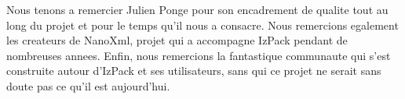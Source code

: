 Nous tenons a remercier Julien Ponge pour son encadrement de qualite tout au long du projet et pour le temps qu'il nous a consacre. Nous remercions egalement les createurs de NanoXml, projet qui a accompagne IzPack pendant de nombreuses annees. Enfin, nous remercions la fantastique communaute qui s'est construite autour d'IzPack et ses utilisateurs, sans qui ce projet ne serait sans doute pas ce qu'il est aujourd'hui.